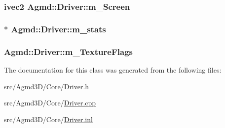 \hypertarget{class_agmd_1_1_driver_a9a3219f10ce291ad3347ad3c25f619be}{
\subsubsection[{m\+\_\+\+Screen}]{\setlength{\rightskip}{0pt plus 5cm}ivec2 Agmd\+::\+Driver\+::m\+\_\+\+Screen\hspace{0.3cm}{\ttfamily [protected]}}}\label{class_agmd_1_1_driver_a9a3219f10ce291ad3347ad3c25f619be}
\hypertarget{class_agmd_1_1_driver_a9c0454173d849b3620e3e5518319f5d6}{
\subsubsection[{m\+\_\+stats}]{$\ast$ Agmd\+::\+Driver\+::m\+\_\+stats\hspace{0.3cm}{\ttfamily [protected]}}}\label{class_agmd_1_1_driver_a9c0454173d849b3620e3e5518319f5d6}
\hypertarget{class_agmd_1_1_driver_ac04c5f985b16457e0aa133c2c860ed7b}{
\subsubsection[{m\+\_\+\+Texture\+Flags}]{ Agmd\+::\+Driver\+::m\+\_\+\+Texture\+Flags\hspace{0.3cm}{\ttfamily [protected]}}}\label{class_agmd_1_1_driver_ac04c5f985b16457e0aa133c2c860ed7b}


The documentation for this class was generated from the following files\+:\begin{DoxyCompactItemize}
\item 
src/\+Agmd3\+D/\+Core/\hyperlink{_driver_8h}{Driver.\+h}\item 
src/\+Agmd3\+D/\+Core/\hyperlink{_driver_8cpp}{Driver.\+cpp}\item 
src/\+Agmd3\+D/\+Core/\hyperlink{_driver_8inl}{Driver.\+inl}\end{DoxyCompactItemize}

